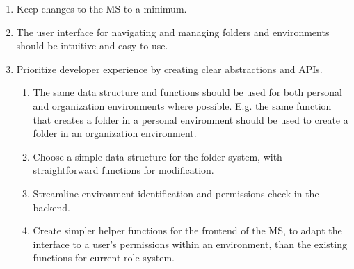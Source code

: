 \begin{enumerate}
	\item Keep changes to the MS to a minimum.


	\item The user interface for navigating and managing folders and environments should
	      be intuitive and easy to use.

	\item Prioritize developer experience by creating clear abstractions and APIs.
	      \begin{enumerate}
		      \item The same data structure and functions should be used for both personal and organization
		            environments where possible. E.g. the same function that creates a folder in a
		            personal environment should be used to create a folder in an organization environment.

		      \item Choose a simple data structure for the folder system, with straightforward
		            functions for modification.

		      \item Streamline environment identification and permissions check in the
                backend.

		      \item Create simpler helper functions for the frontend of the MS, to adapt
		            the interface to a user's permissions within an environment, than the
                existing functions for current role system.
	      \end{enumerate}

\end{enumerate}



